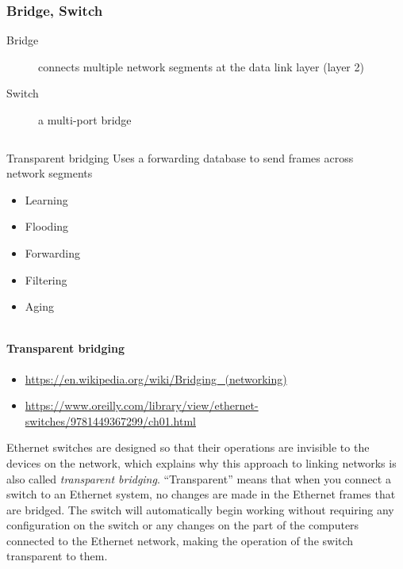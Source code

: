\subsubsection{Bridge, Switch}

\begin{frame}
  \begin{description}
  \item[Bridge] connects multiple network segments at the data link layer (layer 2)
  \item[Switch] a multi-port bridge
  \end{description}
  \begin{columns}[b]
    \begin{column}{.45\linewidth}
      \begin{iblock}{Transparent bridging}
        Uses a forwarding database to send frames across network segments
        \begin{itemize}
        \item Learning
        \item Flooding
        \item Forwarding
        \item Filtering
        \item Aging
        \end{itemize}
      \end{iblock}
    \end{column}
    \begin{column}{.55\linewidth}
      \mode<beamer>{\texttt{[image: switch]}}%
    \end{column}
  \end{columns}
\end{frame}

\paragraph{Transparent bridging}

\begin{itemize}
\item \url{https://en.wikipedia.org/wiki/Bridging_(networking)}
\item \url{https://www.oreilly.com/library/view/ethernet-switches/9781449367299/ch01.html}
\end{itemize}

Ethernet switches are designed so that their operations are invisible to the devices on
the network, which explains why this approach to linking networks is also called
\emph{transparent bridging}. “Transparent” means that when you connect a switch to an Ethernet
system, no changes are made in the Ethernet frames that are bridged. The switch will
automatically begin working without requiring any configuration on the switch or any
changes on the part of the computers connected to the Ethernet network, making the
operation of the switch transparent to them.

